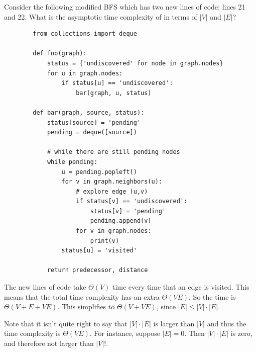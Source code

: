 \begin{prob}

    Consider the following modified BFS which has two new lines of code: lines
    21 and 22. What is the asymptotic time complexity of  in
    terms of $|V|$ and $|E|$?

    \begin{verbatim}
        from collections import deque

        def foo(graph):
            status = {'undiscovered' for node in graph.nodes}
            for u in graph.nodes:
                if status[u] == 'undiscovered':
                    bar(graph, u, status)

        def bar(graph, source, status):
            status[source] = 'pending'
            pending = deque([source])

            # while there are still pending nodes
            while pending: 
                u = pending.popleft()
                for v in graph.neighbors(u):
                    # explore edge (u,v)
                    if status[v] == 'undiscovered':
                        status[v] = 'pending'
                        pending.append(v)
                    for v in graph.nodes:
                        print(v)
                status[u] = 'visited'

            return predecessor, distance
    \end{verbatim}

    \begin{soln}
        The new lines of code take $\Theta(V)$ time every time that an edge
        is visited. This means that the total time complexity has an extra $\Theta(VE)$.
        So the time is $\Theta(V + E + VE)$. This simplifies to $\Theta(V + VE)$, since $|E| \leq |V|\cdot|E|$.

        Note that it isn't quite right to say that $|V|\cdot |E|$ is larger than $|V|$ and thus the 
        time complexity is $\Theta(VE)$. For instance, suppose $|E| = 0$. Then $|V|\cdot|E|$ is zero,
        and therefore not larger than $|V|$!.
    \end{soln}

\end{prob}
